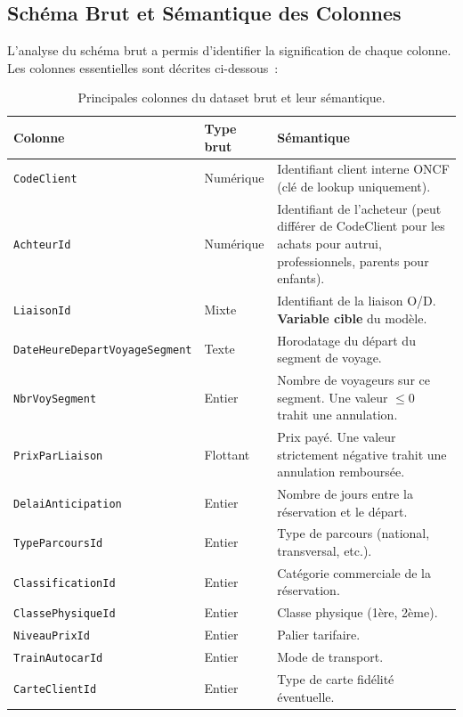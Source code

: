 \documentclass[11pt, a4paper]{article}
\begin{document}
\subsection{Schéma Brut et Sémantique des Colonnes}

L'analyse du schéma brut a permis d'identifier la signification de
chaque colonne. Les colonnes essentielles sont décrites ci-dessous~:

\begin{table}[h]
\centering
\small
\begin{tabularx}{\textwidth}{|l|l|X|}
\hline
\textbf{Colonne} & \textbf{Type brut} & \textbf{Sémantique} \\
\hline
\texttt{CodeClient}                  & Numérique &
  Identifiant client interne ONCF (clé de lookup uniquement). \\
\hline
\texttt{AchteurId}                   & Numérique &
  Identifiant de l'acheteur (peut différer de CodeClient pour les achats
  pour autrui, professionnels, parents pour enfants). \\
\hline
\texttt{LiaisonId}                   & Mixte     &
  Identifiant de la liaison O/D. \textbf{Variable cible} du modèle. \\
\hline
\texttt{DateHeureDepartVoyageSegment}& Texte     &
  Horodatage du départ du segment de voyage. \\
\hline
\texttt{NbrVoySegment}               & Entier    &
  Nombre de voyageurs sur ce segment. Une valeur $\leq 0$ trahit une
  annulation. \\
\hline
\texttt{PrixParLiaison}              & Flottant  &
  Prix payé. Une valeur strictement négative trahit une annulation
  remboursée. \\
\hline
\texttt{DelaiAnticipation}           & Entier    &
  Nombre de jours entre la réservation et le départ. \\
\hline
\texttt{TypeParcoursId}              & Entier    & Type de parcours
  (national, transversal, etc.). \\
\hline
\texttt{ClassificationId}            & Entier    & Catégorie
  commerciale de la réservation. \\
\hline
\texttt{ClassePhysiqueId}            & Entier    & Classe physique
  (1ère, 2ème). \\
\hline
\texttt{NiveauPrixId}                & Entier    & Palier tarifaire. \\
\hline
\texttt{TrainAutocarId}              & Entier    & Mode de transport. \\
\hline
\texttt{CarteClientId}               & Entier    & Type de carte
  fidélité éventuelle. \\
\hline
\end{tabularx}
\caption{Principales colonnes du dataset brut et leur sémantique.}
\end{table}
\end{document}

